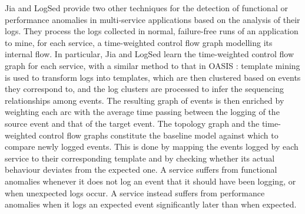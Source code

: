 Jia \etal \cite{31_Jia2017_AnomalyDiagnosisHybridGraphModel} and LogSed \etal \cite{32_Jia2017_LogSed} provide two other techniques for the detection of functional or performance anomalies in multi-service applications based on the analysis of their logs.
They process the logs collected in normal, failure-free runs of an application to mine, for each service, a time-weighted control flow graph modelling its internal flow.
In particular, Jia \etal \cite{31_Jia2017_AnomalyDiagnosisHybridGraphModel} and LogSed \etal \cite{32_Jia2017_LogSed} learn the time-weighted control flow graph for each service, with a similar method to that in OASIS \cite{38_Nandi2016_AnomalyDetectionControlFlowGraphMining}:
template mining is used to transform logs into templates, which are then clustered based on events they correspond to, and the log clusters are processed to infer the sequencing relationships among events. 
The resulting graph of events is then enriched by weighting each arc with the average time passing between the logging of the source event and that of the target event.
The topology graph and the time-weighted control flow graphs constitute the baseline model against which to compare newly logged events. 
This is done by mapping the events logged by each service to their corresponding template and by checking whether its actual behaviour deviates from the expected one.
A service suffers from functional anomalies whenever it does not log an event that it should have been logging, or when unexpected logs occur.
A service instead suffers from performance anomalies when it logs an expected event significantly later than when expected. 

